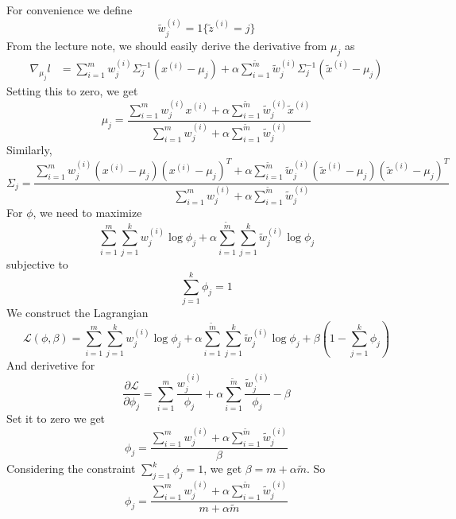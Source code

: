 \begin{answer}
    For convenience we define
$$
\tilde w^{(i)}_j = 1\{\tilde z^{(i)} = j\}
$$
From the lecture note, we should easily derive the derivative from $\mu_j$ as
$$
\begin{aligned}
\nabla_{\mu_j}l &= \sum_{i=1}^m w^{(i)}_j \Sigma_j^{-1}(x^{(i)} - \mu_j) + \alpha \sum_{i=1}^{\tilde m}\tilde w^{(i)}_j \Sigma_j^{-1}(\tilde x^{(i)} - \mu_j)
\end{aligned}
$$
Setting this to zero, we get
$$
\mu_j = \frac{\sum_{i=1}^m w^{(i)}_j x^{(i)}+ \alpha \sum_{i=1}^{\tilde m}\tilde w^{(i)}_j\tilde x^{(i)}}{\sum_{i=1}^m w^{(i)}_j + \alpha \sum_{i=1}^{\tilde m}\tilde w^{(i)}_j}
$$
Similarly,
$$
\Sigma_j = \frac{\sum_{i=1}^m w^{(i)}_j (x^{(i)} - \mu_j)(x^{(i)} - \mu_j)^T+ \alpha \sum_{i=1}^{\tilde m}\tilde w^{(i)}_j (\tilde x^{(i)} - \mu_j)(\tilde x^{(i)} - \mu_j)^T}{\sum_{i=1}^m w^{(i)}_j + \alpha \sum_{i=1}^{\tilde m}\tilde w^{(i)}_j}
$$
For $\phi$, we need to maximize
$$
\sum_{i=1}^m\sum_{j=1}^kw^{(i)}_j \log \phi_j + \alpha\sum_{i=1}^{\tilde m}\sum_{j=1}^k\tilde w^{(i)}_j \log \phi_j
$$
subjective to
$$
\sum_{j=1}^k \phi_j = 1
$$
We construct the Lagrangian
$$
    \mathcal L(\phi, \beta) =\sum_{i=1}^m\sum_{j=1}^kw^{(i)}_j \log \phi_j + \alpha\sum_{i=1}^{\tilde m}\sum_{j=1}^k\tilde w^{(i)}_j \log \phi_j + \beta(1 - \sum_{j=1}^k \phi_j)
$$
And derivetive for
$$
    \frac{\partial\mathcal L}{\partial \phi_j} = \sum_{i=1}^m\frac{w^{(i)}_j}{\phi_j} + \alpha \sum_{i=1}^{\tilde m}\frac{\tilde w^{(i)}_j}{\phi_j} - \beta
$$
Set it to zero we get
$$
    \phi_j = \frac{\sum_{i=1}^mw^{(i)}_j + \alpha \sum_{i=1}^{\tilde m}{\tilde w}^{(i)}_j}{\beta}
$$
Considering the constraint $\sum_{j=1}^k \phi_j = 1$, we get $\beta = m + \alpha \tilde m$. So
$$
    \phi_j = \frac{\sum_{i=1}^mw^{(i)}_j + \alpha \sum_{i=1}^{\tilde m}\tilde w^{(i)}_j}{m + \alpha \tilde m}
$$



\end{answer}
